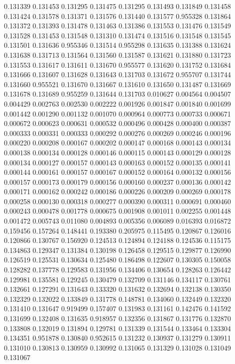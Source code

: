 0.131339
0.131453
0.131295
0.131475
0.131295
0.131493
0.131849
0.131458
0.131424
0.131578
0.131371
0.131576
0.131440
0.131577
0.955328
0.131864
0.131372
0.131393
0.131478
0.131463
0.131386
0.131553
0.131476
0.131549
0.131528
0.131453
0.131548
0.131310
0.131474
0.131516
0.131548
0.131545
0.131501
0.131636
0.955346
0.131514
0.955298
0.131635
0.131388
0.131624
0.131638
0.131713
0.131564
0.131560
0.131587
0.131621
0.131880
0.131723
0.131553
0.131617
0.131611
0.131670
0.955577
0.131620
0.131752
0.131684
0.131666
0.131607
0.131628
0.131643
0.131703
0.131672
0.955707
0.131744
0.131660
0.955521
0.131670
0.131667
0.131610
0.131650
0.131487
0.131669
0.131678
0.131689
0.955259
0.131644
0.131703
0.010627
0.004564
0.004507
0.004429
0.002763
0.002530
0.002222
0.001926
0.001847
0.001840
0.001699
0.001442
0.001290
0.001132
0.001070
0.000964
0.000773
0.000733
0.000671
0.000672
0.000623
0.000631
0.000532
0.000496
0.000428
0.000400
0.000387
0.000333
0.000331
0.000333
0.000292
0.000276
0.000269
0.000246
0.000196
0.000220
0.000208
0.000167
0.000202
0.000147
0.000168
0.000143
0.000134
0.000138
0.000134
0.000128
0.000146
0.000115
0.000143
0.000129
0.000128
0.000134
0.000127
0.000157
0.000143
0.000163
0.000152
0.000135
0.000141
0.000144
0.000161
0.000157
0.000167
0.000152
0.000164
0.000132
0.000156
0.000157
0.000173
0.000179
0.000156
0.000160
0.000237
0.000136
0.000142
0.000171
0.000162
0.000242
0.000186
0.000226
0.000209
0.000269
0.000178
0.000258
0.000130
0.000318
0.000277
0.000390
0.000311
0.000691
0.000460
0.000243
0.000478
0.001778
0.000675
0.001908
0.001011
0.002255
0.001448
0.001472
0.005743
0.011080
0.004893
0.005356
0.006089
0.016393
0.016872
0.159456
0.157264
0.148441
0.193380
0.205975
0.115495
0.120867
0.126016
0.120866
0.130767
0.156920
0.124513
0.124894
0.124188
0.124536
0.115175
0.134863
0.129347
0.131384
0.130198
0.126458
0.129515
0.129877
0.126990
0.126519
0.125531
0.130634
0.125480
0.186498
0.122607
0.130305
0.150058
0.128282
0.137778
0.129583
0.131956
0.134406
0.130654
0.128263
0.126442
0.129981
0.135581
0.129245
0.130479
0.132709
0.131146
0.134117
0.130761
0.132661
0.127291
0.131643
0.133320
0.131632
0.132694
0.132138
0.130350
0.132329
0.132022
0.133849
0.131778
0.148781
0.134060
0.132449
0.132320
0.131410
0.131647
0.919499
0.157407
0.131983
0.131161
0.142476
0.141592
0.131699
0.132408
0.131635
0.918957
0.132356
0.131867
0.131776
0.132870
0.133808
0.132019
0.131894
0.129781
0.131339
0.131544
0.133464
0.133304
0.134351
0.951878
0.130840
0.952615
0.131232
0.130937
0.131279
0.130911
0.131010
0.130813
0.130959
0.130992
0.131065
0.131329
0.131028
0.131049
0.131067
